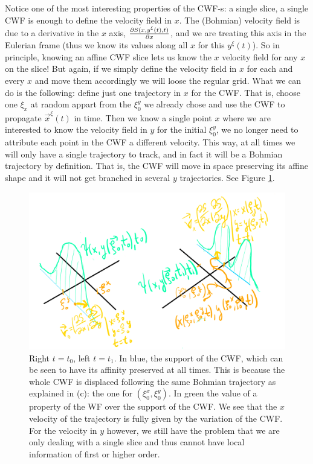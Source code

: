 \documentclass[11pt, a4paper]{article} %
\begin{document}
Notice one of the most interesting properties of the CWF-s: a single slice, a single CWF is enough to define the velocity field in $x$. The (Bohmian) velocity field is due to a derivative in the $x$ axis, $\pdv{S(x,y^\xi(t),t)}{x}$, and we are treating this axis in the Eulerian frame (thus we know its values along all $x$ for this $y^\xi(t)$). So in principle, knowing an affine CWF slice lets us know the $x$ velocity field for any $x$ on the slice!  But again, if we simply define the velocity field in $x$ for each and every $x$ and move them accordingly we will loose the regular grid. What we can do is the following: define just one trajectory in $x$ for the CWF. That is, choose one $\xi_x$ at random appart from the $\xi^y_0$ we already chose and use the CWF to propagate $\vec{x}^\xi(t)$ in time. Then we know a single point $x$ where we are interested to know the velocity field in $y$ for the initial $\xi^y_0$, we no longer need to attribute each point in the CWF a different velocity. This way, at all times we will only have a single trajectory to track, and in fact it will be a Bohmian trajectory by definition. That is, the CWF will move in space preserving its affine shape and it will not get branched in several $y$ trajectories. See Figure \ref{fig:singleTraj}.

\begin{figure}[h!]
  \centering
    \includegraphics[width=0.65\linewidth]{moving_bohmian.png}
  \caption{Right $t=t_0$, left $t=t_1$. In blue, the support of the CWF, which can be seen to have its affinity preserved at all times. This is because the whole CWF is displaced following the same Bohmian trajectory as explained in (c): the one for $(\xi^x_0, \xi^y_0)$. In green the value of a property of the WF over the support of the CWF. We see that the $x$ velocity of the trajectory is fully given by the variation of the CWF. For the velocity in $y$ however, we still have the problem that we are only dealing with a single slice and thus cannot have local information of first or higher order. }
  \label{fig:singleTraj}
\end{figure}
\end{document}
